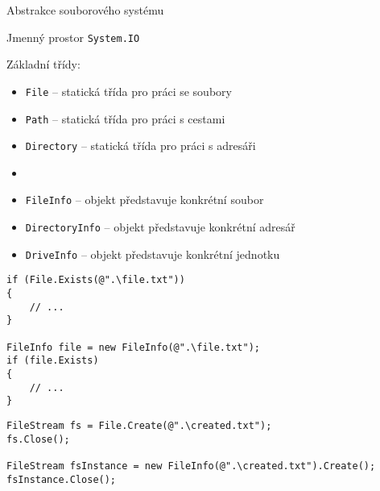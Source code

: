 %
%
%
%
%





\begin{frame}[fragile]
\begin{bitemize}{Abstrakce souborového systému}
\item Jmenný prostor \lstinline|System.IO|
\item Základní třídy:
\begin{itemize}
\item \lstinline|File| -- statická třída pro práci se soubory
\item \lstinline|Path| -- statická třída pro práci s cestami
\item \lstinline|Directory| -- statická třída pro práci s adresáři
\item[]
\item \lstinline|FileInfo| -- objekt představuje konkrétní soubor
\item \lstinline|DirectoryInfo| -- objekt představuje konkrétní adresář
\item \lstinline|DriveInfo| -- objekt představuje konkrétní jednotku

\end{itemize}

\end{bitemize}
\end{frame}




\begin{frame}[fragile]
\begin{yesblock}
\begin{lstlisting}
if (File.Exists(@".\file.txt"))
{
    // ...
}

FileInfo file = new FileInfo(@".\file.txt");
if (file.Exists)
{
    // ...
}
\end{lstlisting}
\end{yesblock}
\vfill
\begin{yesblock}
\begin{lstlisting}
FileStream fs = File.Create(@".\created.txt");
fs.Close();

FileStream fsInstance = new FileInfo(@".\created.txt").Create();
fsInstance.Close();
\end{lstlisting}
\end{yesblock}
\end{frame}




